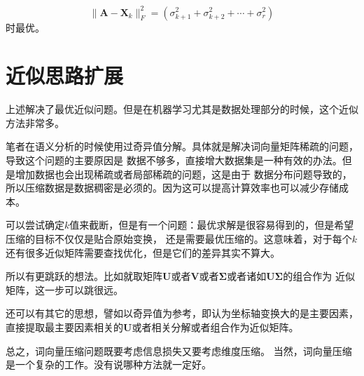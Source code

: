 \documentclass{article}
\begin{document}
        \[\|\boldsymbol{A}-\boldsymbol{X}_k\|_F^2=(\sigma_{k+1}^2+\sigma_{k+2}^2+\cdots+\sigma_r^2)\]
        时最优。

    
    \section{近似思路扩展}
        上述解决了最优近似问题。但是在机器学习尤其是数据处理部分的时候，这个近似方法非常多。

        笔者在语义分析的时候使用过奇异值分解。具体就是解决词向量矩阵稀疏的问题，导致这个问题的主要原因是
        数据不够多，直接增大数据集是一种有效的办法。但是增加数据也会出现稀疏或者局部稀疏的问题，这是由于
        数据分布问题导致的，所以压缩数据是数据稠密是必须的。因为这可以提高计算效率也可以减少存储成本。

        可以尝试确定$k$值来截断，但是有一个问题：最优求解是很容易得到的，但是希望压缩的目标不仅仅是贴合原始变换，
        还是需要最优压缩的。这意味着，对于每个$k$还有很多近似矩阵需要查找优化，但是它们的差异其实不算大。

        所以有更跳跃的想法。比如就取矩阵$\boldsymbol{U}$或者$\boldsymbol{V}$或者$\boldsymbol{\Sigma}$或者诸如$\boldsymbol{U}\boldsymbol{\Sigma}$的组合作为
        近似矩阵，这一步可以跳很远。

        还可以有其它的思想，譬如以奇异值为参考，即认为坐标轴变换大的是主要因素，直接提取最主要因素相关的$\boldsymbol{U}$或者相关分解或者组合作为近似矩阵。
        
        总之，词向量压缩问题既要考虑信息损失又要考虑维度压缩。
        当然，词向量压缩是一个复杂的工作。没有说哪种方法就一定好。
\end{document}
